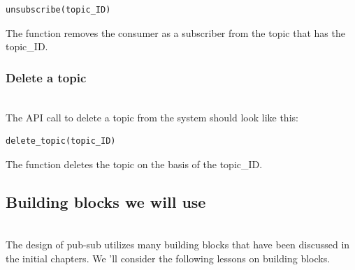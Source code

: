 \begin{verbatim}
unsubscribe(topic_ID)
\end{verbatim}

The function removes the consumer as a subscriber from the topic that has the topic\_ID.

\begin{table}[htbp]
\centering
\small
{}
\end{table}

\subsubsection{Delete a topic}\label{eHKKCJy20rMuuO5QlnO-o}
\\
The API call to delete a topic from the system should look like this:

\begin{verbatim}
delete_topic(topic_ID)
\end{verbatim}

The function deletes the topic on the basis of the topic\_ID.

\begin{table}[htbp]
\centering
\small
{}
\end{table}

\subsection{Building blocks we will use}\label{IKX-fjarmW4rDIidvUlgl}
\\
The design of pub-sub utilizes many building blocks that have been discussed in the initial chapters. We 'll consider the following lessons on building blocks.

